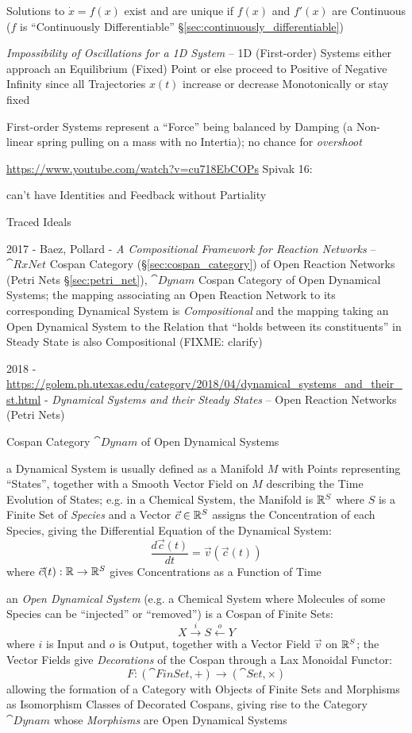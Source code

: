 Solutions to $\dot{x} = f(x)$ exist and are unique if $f(x)$ and $f'(x)$ are
Continuous ($f$ is ``Continuously Differentiable''
\S\ref{sec:continuously_differentiable})

\emph{Impossibility of Oscillations for a 1D System} -- 1D (First-order)
Systems either approach an Equilibrium (Fixed) Point or else proceed to
Positive of Negative Infinity since all Trajectories $x(t)$ increase or
decrease Monotonically or stay fixed

First-order Systems represent a ``Force'' being balanced by Damping (a
Non-linear spring pulling on a mass with no Intertia); no chance for
\emph{overshoot}

\asterism

\url{https://www.youtube.com/watch?v=cu718EbCOPs} Spivak 16:

can't have Identities and Feedback without Partiality %

Traced Ideals %

2017 - Baez, Pollard - \emph{A Compositional Framework for Reaction Networks}
-- $\cat{RxNet}$ Cospan Category (\S\ref{sec:cospan_category}) of Open Reaction
Networks (Petri Nets \S\ref{sec:petri_net}), $\cat{Dynam}$ Cospan Category of
Open Dynamical Systems; the mapping associating an Open Reaction Network to its
corresponding Dynamical System is \emph{Compositional} and the mapping taking
an Open Dynamical System to the Relation that ``holds between its
constituents'' in Steady State is also Compositional (FIXME: clarify)

2018 - \url{https://golem.ph.utexas.edu/category/2018/04/dynamical_systems_and_their_st.html} -
\emph{Dynamical Systems and their Steady States} -- Open Reaction Networks
(Petri Nets)

Cospan Category $\cat{Dynam}$ of Open Dynamical Systems

a Dynamical System is usually defined as a Manifold $M$ with Points
representing ``States'', together with a Smooth Vector Field on $M$ describing
the Time Evolution of States; e.g. in a Chemical System, the Manifold is
$\mathbb{R}^S$ where $S$ is a Finite Set of \emph{Species} and a Vector $\vec{c}
\in \mathbb{R}^S$ assigns the Concentration of each Species, giving the
Differential Equation of the Dynamical System:
\[
  \frac{d\vec{c}(t)}{dt} = \vec{v}(\vec{c}(t))
\]
where $\vec{c}(t) : \mathbb{R} \rightarrow \mathbb{R}^S$ gives Concentrations as a
Function of Time

an \emph{Open Dynamical System} (e.g. a Chemical System where Molecules of some
Species can be ``injected'' or ``removed'') is a Cospan of Finite Sets:
\[
  X \xrightarrow{i} S \xleftarrow{o} Y
\]
where $i$ is Input and $o$ is Output, together with a Vector Field $\vec{v}$ on
$\mathbb{R}^S$; the Vector Fields give \emph{Decorations} of the Cospan through a
Lax Monoidal Functor:
\[
  F : (\cat{FinSet}, +) \rightarrow (\cat{Set}, \times)
\]
allowing the formation of a Category with Objects of Finite Sets and Morphisms
as Isomorphism Classes of Decorated Cospans, giving rise to the Category
$\cat{Dynam}$ whose \emph{Morphisms} are Open Dynamical Systems

